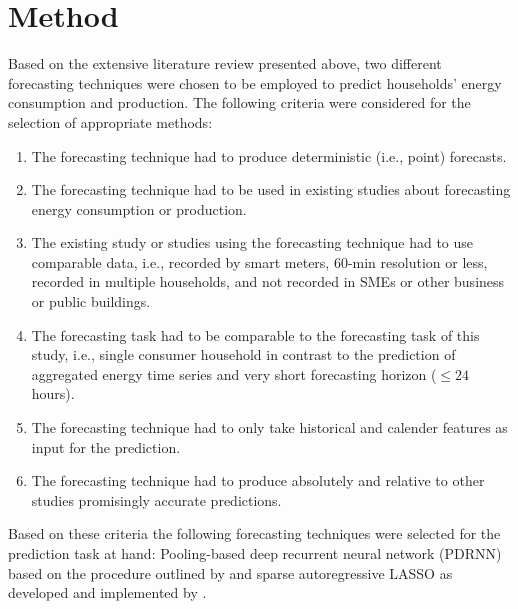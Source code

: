 
\section{Method}\label{Sec:Method}

Based on the extensive literature review presented above, two different forecasting techniques were chosen to be employed to predict households' energy consumption and production. The following criteria were considered for the selection of appropriate methods: 

\begin{enumerate}
    \item The forecasting technique had to produce deterministic (i.e., point) forecasts.
    \item The forecasting technique had to be used in existing studies about forecasting energy consumption or production.
    \item The existing study or studies using the forecasting technique had to use comparable data, i.e., recorded by smart meters, 60-min resolution or less, recorded in multiple households, and not recorded in SMEs or other business or public buildings.
    \item The forecasting task had to be comparable to the forecasting task of this study, i.e., single consumer household in contrast to the prediction of aggregated energy time series and very short forecasting horizon ($\leq 24$ hours).
    \item The forecasting technique had to only take historical and calender features as input for the prediction.
    \item The forecasting technique had to produce absolutely and relative to other studies promisingly accurate predictions.
\end{enumerate}


\noindent Based on these criteria the following forecasting techniques were selected for the prediction task at hand: Pooling-based deep recurrent neural network (PDRNN) based on the procedure outlined by \citet{Shi:2017} and sparse autoregressive LASSO as developed and implemented by \citet{Li:2017}.%

